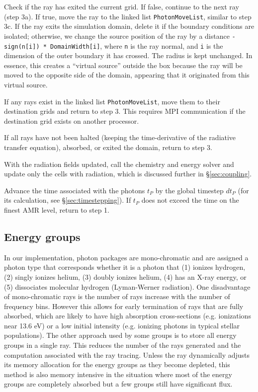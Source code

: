 \documentclass[12pt,preprint]{aastex}
\begin{document}
 Check if the ray has exited the current grid.  If false,
continue to the next ray (step 3a).  If true, move the ray to the
linked list \texttt{PhotonMoveList}, similar to step 3c.  If the ray
exits the simulation domain, delete it if the boundary conditions are
isolated; otherwise, we change the source position of the ray by a
distance \texttt{-sign(n[i]) * DomainWidth[i]}, where \texttt{n} is
the ray normal, and \texttt{i} is the dimension of the outer boundary
it has crossed.  The radius is kept unchanged.  In essence, this
creates a ``virtual source'' outside the box because the ray will be
moved to the opposite side of the domain, appearing that it originated
from this virtual source.

 If any rays exist in the linked list \texttt{PhotonMoveList},
move them to their destination grids and return to step 3.  This
requires MPI communication if the destination grid exists on another
processor.

 If all rays have not been halted (keeping the time-derivative
of the radiative transfer equation), absorbed, or exited the domain,
return to step 3.

 With the radiation fields updated, call the chemistry and
energy solver and update only the cells with radiation, which is
discussed further in \S\ref{sec:coupling}.

 Advance the time associated with the photons $t_P$ by the
global timestep $dt_P$ (for its calculation, see
\S\ref{sec:timestepping}).  If $t_P$ does not exceed the time on the
finest AMR level, return to step 1.

\subsection{Energy groups}

In our implementation, photon packages are mono-chromatic and are
assigned a photon type that corresponds whether it is a photon that
(1) ionizes hydrogen, (2) singly ionizes helium, (3) doubly ionizes
helium, (4) has an X-ray energy, or (5) dissociates molecular hydrogen
(Lyman-Werner radiation).  One disadvantage of mono-chromatic rays is
the number of rays increase with the number of frequency bins.
However this allows for early termination of rays that are fully
absorbed, which are likely to have high absorption cross-sections
(e.g.  ionizations near 13.6 eV) or a low initial intensity
(e.g.  ionizing photons in typical stellar populations).
The other approach used by some groups \citep[e.g.][]{Trac07} is to
store all energy groups in a single ray.  This reduces the number of
the rays generated and the computation associated with the ray
tracing.  Unless the ray dynamically adjusts its memory allocation for
the energy groups as they become depleted, this method is also memory
intensive in the situation where most of the energy groups are
completely absorbed but a few groups still have significant flux.
\end{document}
